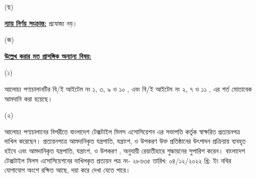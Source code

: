 \documentclass[12pt]{article}
\newcommand{\btmaltno}{প্রত্যয়ন পত্র নং- ২৮৬৩৫}
\newcommand{\btmaltnodt}{তারিখ:  ০৪/১২/২০২২ খ্রি:}
\begin{document}
\begin{minipage}[t]{0.05\linewidth}
(ছ)
\end{minipage}
\begin{minipage}[t]{0.90\linewidth}
\underline{\textbf{ন্যায় নির্ণয় সংক্রান্ত:}} প্রযোজ্য নয়।
\\
\end{minipage}
\begin{minipage}[t]{0.05\linewidth}
\hspace{1em}
\end{minipage}
\begin{minipage}[t]{0.05\linewidth}
(জ)
\end{minipage}
\begin{minipage}[t]{0.05\linewidth}
\end{minipage}
\begin{minipage}[t]{0.90\linewidth}
\underline{\textbf{উল্লেখ করার মত প্রাসঙ্গিক অন্যান্য বিষয়:}}
\end{minipage}
\footnotesize
\begin{minipage}[t]{0.05\linewidth}
\hspace{1em}
\end{minipage}
\begin{minipage}[t]{0.05\linewidth}
\hspace{1em}
\end{minipage}
\begin{minipage}[t]{0.05\linewidth}
(১)
\end{minipage}
\begin{minipage}[t]{0.85\linewidth}
আলোচ্য পণ্যচালানটির বি/ই আইটেম নং ১, ৩, ৯ ও ১০ {\srooot}, {\sroootd} এবং বি/ই আইটেম নং ২, ৭ ও ১১ {\srootz}, {\srootzd} এর শর্ত মোতাবেক
আমদানি করা হয়েছে।
\end{minipage}
\begin{minipage}[t]{0.05\linewidth}
\hspace{1em}
\end{minipage}
\begin{minipage}[t]{0.05\linewidth}
\hspace{1em}
\end{minipage}
\begin{minipage}[t]{0.05\linewidth}
(২)
\end{minipage}
\begin{minipage}[t]{0.85\linewidth}
আলোচ্য পণ্যচালানের বিপরীতে বাংলাদেশ
টেক্সটাইল মিলস এসোসিয়েশন এর সভাপতি
কর্তৃক স্বাক্ষরিত প্রত্যয়নপত্র
দাখিল করেছেন। প্রত্যয়নপত্রে আমদানিকৃত
যন্ত্রপাতি, যন্ত্রাংশ, ও উপকরণ
উক্ত প্রতিষ্ঠানের উৎপাদন প্রক্রিয়ায়
ব্যবহৃত হইবে এবং আমদানিকৃত
যন্ত্রপাতি, যন্ত্রাংশ, ও উপকরণ
{\srooot}, {\sroootd} অনুযায়ী
রেয়াতীহারে শুল্কায়নের সুপারিশ
করেন। বাংলাদেশ টেক্সটাইল মিলস
এসোসিয়েশনের দাখিলকৃত {\btmaltno}
{\btmaltnodt} ইং নথির যোগাযোগ অংশে রক্ষিত
আছে, দয়া করে দেখা যেতে পারে।
\end{minipage}
\end{document}
